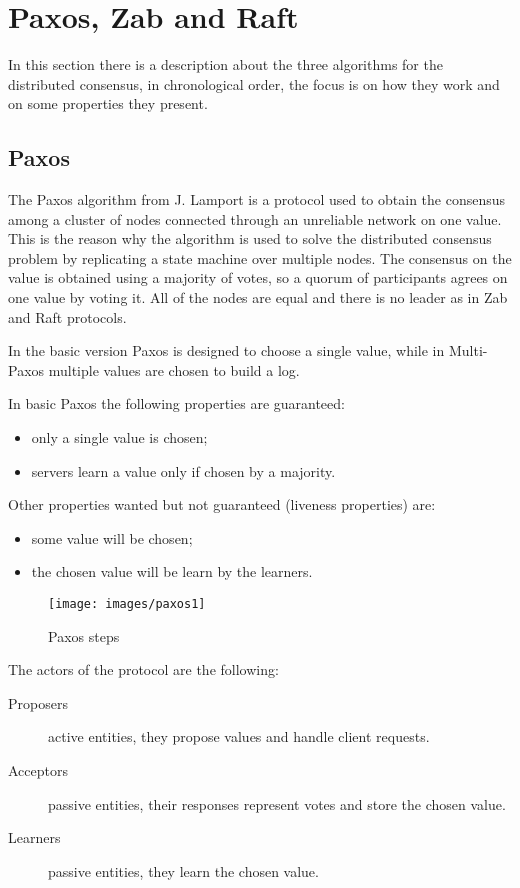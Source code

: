 \chapter{Paxos, Zab and Raft\label{sec:algorithms}}

In this section there is a description about the three algorithms for the distributed consensus, in chronological order, the focus is on how they work and on some properties they present.

\section{Paxos\label{sec:paxos}}

The Paxos algorithm from J. Lamport is a protocol used to obtain the consensus among a cluster of nodes connected through an unreliable network on one value.
This is the reason why the algorithm is used to solve the distributed consensus problem by replicating a state machine over multiple nodes.
The consensus on the value is obtained using a majority of votes, so a quorum of participants agrees on one value by voting it.
All of the nodes are equal and there is no leader as in Zab and Raft protocols.

In the basic version Paxos is designed to choose a single value, while in Multi-Paxos multiple values are chosen to build a log.

In basic Paxos the following properties are guaranteed:
\begin{itemize}
    \item only a single value is chosen;
    \item servers learn a value only if chosen by a majority.
\end{itemize}

Other properties wanted but not guaranteed (liveness properties) are:
\begin{itemize}
    \item some value will be chosen;
    \item the chosen value will be learn by the learners.
\end{itemize}

\begin{figure}[H]
    \centering
    \texttt{[image: images/paxos1]}
    \caption{Paxos steps}
    \label{fig:paxos}
\end{figure}

The actors of the protocol are the following:
\begin{description}
    \item[Proposers] active entities, they propose values and handle client requests.
    \item[Acceptors] passive entities, their responses represent votes and store the chosen value.
    \item[Learners] passive entities, they learn the chosen value.  
\end{description}

